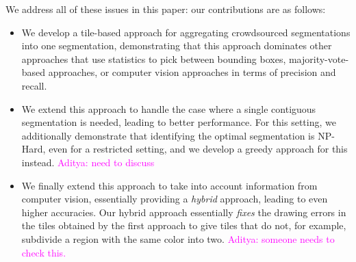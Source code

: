 \documentclass[letterpaper]{article} %
\newcommand{\agp}[1]{\textcolor{magenta}{Aditya: #1}}
\begin{document}
We address all of these issues in this paper: 
our contributions are as follows:
\begin{itemize}
\item We develop a tile-based approach for aggregating
crowdsourced segmentations into one segmentation,
demonstrating that this approach dominates other approaches
that use statistics to pick between bounding boxes, majority-vote-based
approaches, or computer vision approaches in terms of precision and recall.
\item We extend this approach to handle the case where 
a single contiguous segmentation is needed, leading to better performance.
For this setting, we additionally demonstrate that identifying the optimal 
segmentation is {\sc NP-Hard}, even for a restricted setting,
and we develop a greedy approach for this instead. \agp{need to discuss}
\item We finally extend this approach to take into account
information from computer vision, essentially providing a
{\em hybrid} approach, leading to even higher accuracies. 
Our hybrid approach essentially {\em fixes} the
drawing errors in the tiles obtained
by the first approach to give tiles that do not, for example,
subdivide a region with the same color into two. \agp{someone needs to check this.}
\end{itemize}



\end{document}
